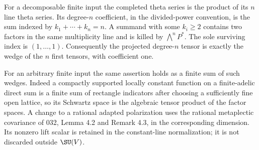 \documentclass[11pt]{article}
\theoremstyle{definition}\newtheorem{definition}[theorem]{Definition}\newtheorem{remark}[theorem]{Remark}
\begin{document}
For a decomposable finite input the completed theta series is the
product of its $n$ line theta series. Its degree-$n$ coefficient,
in the divided-power convention, is the sum indexed by
$k_1+\cdots+k_n=n$. A summand with some $k_i\geq2$ contains
two factors in the same multiplicity line and is killed by
$\bigwedge^nP^*$. The sole surviving index is $(1,\ldots,1)$.
Consequently the projected degree-$n$ tensor is exactly the wedge
of the $n$ first tensors, with coefficient one.

For an arbitrary finite input the same assertion holds as a finite
sum of such wedges. Indeed a compactly supported locally constant
function on a finite-adelic direct sum is a finite sum of rectangle
indicators after choosing a sufficiently fine open lattice, so its
Schwartz space is the algebraic tensor product of the factor spaces.
A change to a rational adapted polarization uses the rational
metaplectic covariance of 032, Lemma 4.2 and Remark 4.3, in the
corresponding dimension. Its nonzero lift scalar is retained in the
constant-line normalization; it is not discarded outside $\SU(V)$.
\end{document}
